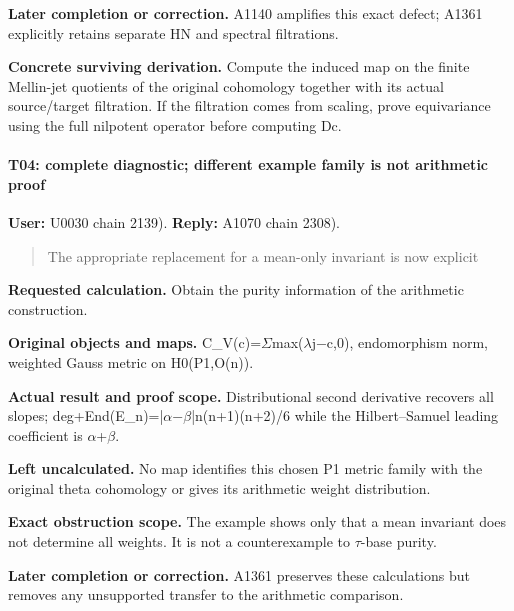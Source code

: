 \textbf{Later completion or correction.} A1140 amplifies this exact
defect; A1361 explicitly retains separate HN and spectral filtrations.

\textbf{Concrete surviving derivation.} Compute the induced map on the
finite Mellin-jet quotients of the original cohomology together with its
actual source/target filtration. If the filtration comes from scaling,
prove equivariance using the full nilpotent operator before computing
Dc.

\paragraph{T04: complete diagnostic; different example family is not
arithmetic
proof}\label{t04-complete-diagnostic-different-example-family-is-not-arithmetic-proof}

\textbf{User:} U0030
\protect{} chain 2139).
\textbf{Reply:} A1070
\protect{} chain 2308).

\begin{quote}
The appropriate replacement for a mean-only invariant is now explicit
\end{quote}

\textbf{Requested calculation.} Obtain the purity information of the
arithmetic construction.

\textbf{Original objects and maps.}
C\_V(c)=\allowbreak{}\ensuremath{Σ}\allowbreak{}max(\allowbreak{}\ensuremath{λ}\allowbreak{}j\allowbreak{}\ensuremath{−}\allowbreak{}c,0),
endomorphism norm, weighted Gauss metric on H0(P1,O(n)).

\textbf{Actual result and proof scope.} Distributional second derivative
recovers all slopes;
deg+End(E\_n)=|\allowbreak{}\ensuremath{α}\allowbreak{}\allowbreak{}\ensuremath{−}\allowbreak{}\allowbreak{}\ensuremath{β}\allowbreak{}|n(n+1)(n+2)/6
while the Hilbert--Samuel leading coefficient is
\allowbreak{}\ensuremath{α}\allowbreak{}+\allowbreak{}\ensuremath{β}\allowbreak{}.

\textbf{Left uncalculated.} No map identifies this chosen P1 metric
family with the original theta cohomology or gives its arithmetic weight
distribution.

\textbf{Exact obstruction scope.} The example shows only that a mean
invariant does not determine all weights. It is not a counterexample to
\allowbreak{}\ensuremath{τ}\allowbreak{}-base purity.

\textbf{Later completion or correction.} A1361 preserves these
calculations but removes any unsupported transfer to the arithmetic
comparison.

